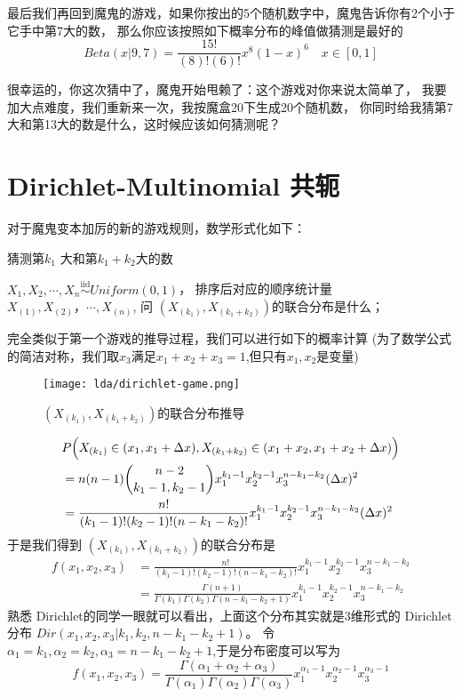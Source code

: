 最后我们再回到魔鬼的游戏，如果你按出的5个随机数字中，魔鬼告诉你有2个小于它手中第7大的数，
那么你应该按照如下概率分布的峰值做猜测是最好的
$$ Beta(x|9,7) = \frac{15!}{(8)!(6)!}x^{8}(1-x)^{6} \quad x \in [0,1] $$

很幸运的，你这次猜中了，魔鬼开始甩赖了：这个游戏对你来说太简单了，
我要加大点难度，我们重新来一次，我按魔盒20下生成20个随机数，
你同时给我猜第7大和第13大的数是什么，这时候应该如何猜测呢？

\section{Dirichlet-Multinomial 共轭}
对于魔鬼变本加厉的新的游戏规则，数学形式化如下：
\begin{algorithm}[htb]
\caption{猜测第$k_1$ 大和第$k_1+k_2$大的数}
\begin{algorithmic}[1]
\STATE $X_1,X_2,\cdots,X_n {\stackrel{\mathrm{iid}}{\sim}}Uniform(0,1)$，
\STATE 排序后对应的顺序统计量 $X_{(1)},X_{(2)}，\cdots, X_{(n)}$,
\STATE 问 $(X_{(k_1)}, X_{(k_1+k_2)})$的联合分布是什么；
\end{algorithmic}
\end{algorithm}

完全类似于第一个游戏的推导过程，我们可以进行如下的概率计算
(为了数学公式的简洁对称，我们取$x_3$满足$x_1+x_2+x_3 = 1$,但只有$x_1,x_2$是变量)
\begin{figure}[htbp]
\centering
\texttt{[image: lda/dirichlet-game.png]}
\caption{$(X_{(k_1)}, X_{(k_1+k_2)})$的联合分布推导}
\end{figure}
\begin{align*}
& P\Bigl(X_{(k_1)}\in(x_1,x_1+\Delta x),X_{(k_1+k_2)}\in(x_1+x_2,x_1+x_2+\Delta x)\Bigr) \\
& = n(n-1)\binom{n-2}{k_1-1,k_2-1}x_1^{k_1-1}x_2^{k_2-1}x_3^{n-k_1-k_2}(\Delta x)^2 \\
& = \frac{n!}{(k_1-1)!(k_2-1)!(n-k_1-k_2)!}x_1^{k_1-1}x_2^{k_2-1}x_3^{n-k_1-k_2}(\Delta x)^2
\end{align*}
于是我们得到 $(X_{(k_1)}, X_{(k_1+k_2)})$的联合分布是
\begin{align*}
f(x_1,x_2,x_3) & = \frac{n!}{(k_1-1)!(k_2-1)!(n-k_1-k_2)!}x_1^{k_1-1}x_2^{k_2-1}x_3^{n-k_1-k_2} \\
& = \frac{\Gamma(n+1)}{\Gamma(k_1)\Gamma(k_2)\Gamma(n-k_1-k_2+1)}x_1^{k_1-1}x_2^{k_2-1}x_3^{n-k_1-k_2}
\end{align*}
熟悉 Dirichlet的同学一眼就可以看出，上面这个分布其实就是3维形式的 Dirichlet 分布
$Dir(x_1,x_2,x_3|k_1,k_2,n-k_1-k_2+1)$。
令 $\alpha_1=k_1,\alpha_2=k_2,\alpha_3=n-k_1-k_2+1$,于是分布密度可以写为
\begin{equation}
\displaystyle f(x_1,x_2,x_3) = \frac{\Gamma(\alpha_1 + \alpha_2 + \alpha_3)}
{\Gamma(\alpha_1)\Gamma(\alpha_2)\Gamma(\alpha_3)}x_1^{\alpha_1-1}x_2^{\alpha_2-1}x_3^{\alpha_3-1}
\end{equation}

